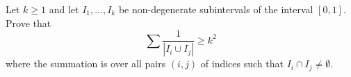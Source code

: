 Let $ k\geq 1 $ and let $ I_{1},\dots, I_{k} $ be non-degenerate subintervals of the interval $ [0, 1] $. Prove that
\[ \sum \frac{1}{\left | I_{i}\cup I_{j} \right |} \geq k^{2} \]
where the summation is over all pairs $ (i, j) $ of indices such that $I_i\cap I_j\neq \emptyset$.